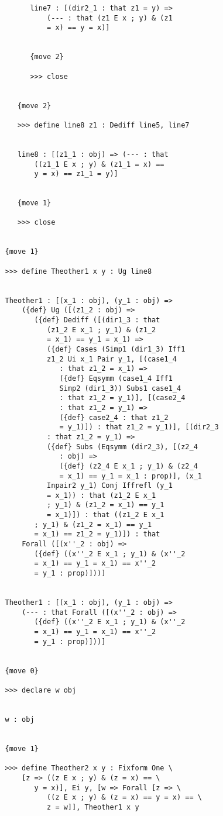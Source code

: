 \documentclass[12pt]{article}
\begin{document}
\begin{verbatim}
         line7 : [(dir2_1 : that z1 = y) => 
             (--- : that (z1 E x ; y) & (z1 
             = x) == y = x)]


         {move 2}

         >>> close


      {move 2}

      >>> define line8 z1 : Dediff line5, line7


      line8 : [(z1_1 : obj) => (--- : that 
          ((z1_1 E x ; y) & (z1_1 = x) == 
          y = x) == z1_1 = y)]


      {move 1}

      >>> close


   {move 1}

   >>> define Theother1 x y : Ug line8


   Theother1 : [(x_1 : obj), (y_1 : obj) => 
       ({def} Ug ([(z1_2 : obj) => 
          ({def} Dediff ([(dir1_3 : that 
             (z1_2 E x_1 ; y_1) & (z1_2 
             = x_1) == y_1 = x_1) => 
             ({def} Cases (Simp1 (dir1_3) Iff1 
             z1_2 Ui x_1 Pair y_1, [(case1_4 
                : that z1_2 = x_1) => 
                ({def} Eqsymm (case1_4 Iff1 
                Simp2 (dir1_3)) Subs1 case1_4 
                : that z1_2 = y_1)], [(case2_4 
                : that z1_2 = y_1) => 
                ({def} case2_4 : that z1_2 
                = y_1)]) : that z1_2 = y_1)], [(dir2_3 
             : that z1_2 = y_1) => 
             ({def} Subs (Eqsymm (dir2_3), [(z2_4 
                : obj) => 
                ({def} (z2_4 E x_1 ; y_1) & (z2_4 
                = x_1) == y_1 = x_1 : prop)], (x_1 
             Inpair2 y_1) Conj Iffrefl (y_1 
             = x_1)) : that (z1_2 E x_1 
             ; y_1) & (z1_2 = x_1) == y_1 
             = x_1)]) : that ((z1_2 E x_1 
          ; y_1) & (z1_2 = x_1) == y_1 
          = x_1) == z1_2 = y_1)]) : that 
       Forall ([(x''_2 : obj) => 
          ({def} ((x''_2 E x_1 ; y_1) & (x''_2 
          = x_1) == y_1 = x_1) == x''_2 
          = y_1 : prop)]))]


   Theother1 : [(x_1 : obj), (y_1 : obj) => 
       (--- : that Forall ([(x''_2 : obj) => 
          ({def} ((x''_2 E x_1 ; y_1) & (x''_2 
          = x_1) == y_1 = x_1) == x''_2 
          = y_1 : prop)]))]


   {move 0}

   >>> declare w obj


   w : obj


   {move 1}

   >>> define Theother2 x y : Fixform One \
       [z => ((z E x ; y) & (z = x) == \
          y = x)], Ei y, [w => Forall [z => \
             ((z E x ; y) & (z = x) == y = x) == \
             z = w]], Theother1 x y



\end{verbatim}
\end{document}
